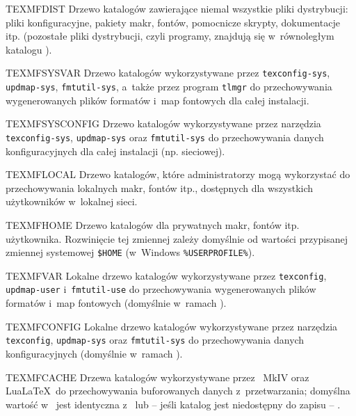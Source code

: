 \documentclass{article}
\begin{document}
\begin{ttdescription}
\item [TEXMFDIST] Drzewo katalogów zawierające niemal wszystkie pliki
 dystrybucji: pliki konfiguracyjne, pakiety makr, fontów, pomocnicze skrypty, dokumentacje itp.
 (pozostałe pliki dystrybucji, czyli programy, znajdują się w~równoległym
 katalogu ).
 \item [TEXMFSYSVAR] Drzewo katalogów wykorzystywane przez
 \verb+texconfig-sys+, \verb+updmap-sys+, \verb+fmtutil-sys+, a~także
 przez program \verb+tlmgr+ do przechowywania wygenerowanych plików
 formatów i~map fontowych dla całej instalacji.
 \item [TEXMFSYSCONFIG] Drzewo katalogów wykorzystywane przez narzędzia
 \verb+texconfig-sys+, \verb+updmap-sys+ oraz \verb+fmtutil-sys+
 do przechowywania danych konfiguracyjnych dla całej instalacji (np.
 sieciowej).
 \item [TEXMFLOCAL] Drzewo katalogów, które administratorzy mogą wykorzystać
 do przechowywania lokalnych makr, fontów itp., dostępnych dla wszystkich
 użytkowników w~lokalnej sieci.
\item [TEXMFHOME] Drzewo katalogów dla prywatnych makr, fontów itp.
 użytkownika. Rozwinięcie tej zmiennej zależy domyślnie od wartości przypisanej
 zmiennej systemowej \verb+$HOME+ (w~Windows \verb+%USERPROFILE%+).
\item [TEXMFVAR] Lokalne drzewo katalogów wykorzystywane przez \verb+texconfig+,
 \verb+updmap-user+ i~\verb+fmtutil-use+ do przechowywania wygenerowanych plików
 formatów i~map fontowych (domyślnie w~ramach ).
\item [TEXMFCONFIG] Lokalne drzewo katalogów wykorzystywane przez narzędzia
 \verb+texconfig+, \verb+updmap-sys+ oraz \verb+fmtutil-sys+ do przechowywania
 danych konfiguracyjnych (domyślnie w~ramach ).
\item [TEXMFCACHE] Drzewa katalogów wykorzystywane przez \ConTeXt\
  MkIV oraz Lua\LaTeX\ do przechowywania buforowanych danych
  z~przetwarzania; domyślna wartość w~\TL{} jest identyczna
  z~ lub -- jeśli katalog jest niedostępny do zapisu
  -- \code{TEXMFVAR}.
\end{ttdescription}
\end{document}

